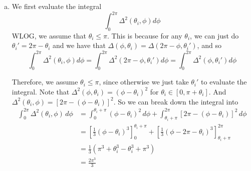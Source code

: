 \documentclass[11pt]{scrartcl}
\begin{document}
\begin{enumerate}[(a)]
    \item We first evaluate the integral \[\int_0^{2\pi} \Delta^2(\theta_i, \phi) d\phi\]
    WLOG, we assume that $\theta_i \le \pi$. This is because for any $\theta_i$, we can just do $\theta_i' = 2\pi - \theta_i$ and we have that $\Delta(\phi, \theta_i) = \Delta(2\pi - \phi, \theta_i')$, and so \[\int_0^{2\pi} \Delta^2(\theta_i, \phi) d\phi = \int_0^{2\pi} \Delta^2(2\pi-\phi, \theta_i') d\phi = \int_0^{2\pi} \Delta^2(\phi, \theta_i')d\phi \]
    
    Therefore, we assume $\theta_i \le \pi$, since otherwise we just take $\theta_i'$ to evaluate the integral. Note that $\Delta^2(\phi, \theta_i) = (\phi-\theta_i)^2$ for $\theta_i \in [0, \pi+\theta_i]$. And $\Delta^2(\theta_i, \phi) = [2\pi - (\phi - \theta_i)]^2$. So we can break down the integral into
    \begin{align*}
        \int_0^{2\pi} \Delta^2(\theta_i,\phi) \, d\phi &= \int_0^{\theta_i+\pi} (\phi-\theta_i)^2 \, d\phi + \int_{\theta_i+\pi}^{2\pi} [2\pi - (\phi - \theta_i)]^2 \, d\phi \\
        &= \left[\frac 13(\phi-\theta_i)^3\right]_0^{\theta_i + \pi} + \left[\frac 13 (\phi - 2\pi - \theta_i)^3\right]_{\theta_i+\pi}^{2\pi} \\
        &= \frac 13 \left(\pi^3 + \theta_i^3 - \theta_i^3 + \pi^3 \right) \\
        &= \frac{2\pi^3}{3}
    \end{align*}
    

\end{enumerate}
\end{document}
